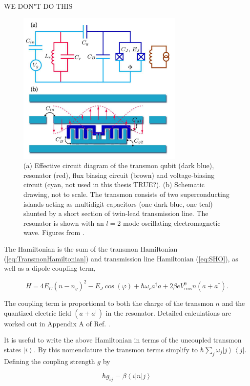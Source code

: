\documentclass[11 pt, oneside]{book} %
\newcommand{\ket}[1]{\left| #1 \right>} %
\newcommand{\bra}[1]{\left< #1 \right|} %
\begin{document}
WE DON"T DO THIS

\begin{figure}[h] 
   \centering
   \includegraphics[height=3in]{KochTransmon.png} 
   \caption[Transmon circuit schematic]{(a) Effective circuit diagram of the transmon qubit (dark blue), resonator (red), flux biasing circuit (brown) and voltage-biasing circuit (cyan, not used in this thesis TRUE?). (b) Schematic drawing, not to scale. The transmon consists of two superconducting islands acting as multidigit capacitors (one dark blue, one teal) shunted by a short section of twin-lead transmission line. The resonator is shown with an $l=2$ mode oscillating electromagnetic wave. Figures from \cite{Koch}.}
   \label{fig:TransmonCoupling}
\end{figure}

The Hamiltonian is the sum of the transmon Hamiltonian (\ref{eq:TransmonHamiltonian}) and transmission line Hamiltonian (\ref{eq:SHO}), as well as a dipole coupling term,

\begin{equation}\label{eq:CQC}
H=4E_C(n-n_g)^2-E_J\cos(\varphi)+\hbar\omega_ra^{\dag}a+2\beta eV^0_{\mathrm{rms}}n(a+a^{\dag}).
\end{equation}

The coupling term is proportional to both the charge of the transmon $n$ and the quantized electric field $(a+a^{\dag})$ in the resonator. Detailed calculations are worked out in Appendix A of Ref. \cite{Koch}.

It is useful to write the above Hamiltonian in terms of the uncoupled transmon states $\ket{i}$. By this nomenclature the transmon terms simplify to $\hbar\sum_j\omega_j\ket{j}\bra{j}$. Defining the coupling strength $g$ by

\begin{equation}
\hbar g_{ij}=\beta\bra{i}n\ket{j}
\end{equation}
\end{document}
